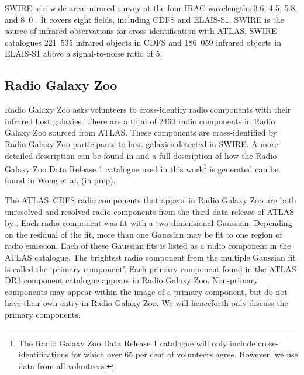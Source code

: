 \documentclass[fleqn,usenatbib,usedcolumn]{mnras}
\begin{document}
    SWIRE \citep{lonsdale03swire, surace05swire} is a wide-area infrared
    survey at the four IRAC wavelengths 3.6, 4.5, 5.8, and
    \unit{8.0}{\micro\meter} \citep{lonsdale03swire}. It covers eight fields, including CDFS and ELAIS-S1. SWIRE is the source of infrared
    observations for cross-identification with ATLAS. SWIRE catalogues 221~535
    infrared objects in CDFS and 186~059 infrared objects in ELAIS-S1 above a signal-to-noise ratio of 5.

  \subsection{Radio Galaxy Zoo}\label{sec:rgz}

    Radio Galaxy Zoo asks volunteers to cross-identify radio components with
    their infrared host galaxies. There are a total of 2460 radio
    components in Radio Galaxy Zoo sourced from ATLAS. These
    components are cross-identified by Radio Galaxy Zoo participants to host galaxies detected in SWIRE.
    A more detailed description can be found in
    \citet{banfield15} and a full description of how the Radio Galaxy Zoo Data Release 1 catalogue used in this work\footnote{The Radio Galaxy Zoo Data Release 1 catalogue will only
    include cross-identifications for which over 65 per cent of volunteers
    agree. However, we use data from all volunteers.}
    is generated can be found in Wong et al. (in prep).

     The ATLAS~CDFS radio components that appear in Radio Galaxy Zoo are both unresolved and resolved radio components from the third data release of ATLAS by \citet{franzen15}.  Each radio component was fit with a two-dimensional
    Gaussian. Depending on the residual of the fit, more than one Gaussian may
    be fit to one region of radio emission.  Each of these Gaussian fits is
    listed as a radio component in the ATLAS catalogue. The brightest radio
    component from the multiple Gaussian fit is called the `primary
    component'. Each primary component found in the ATLAS DR3 component
    catalogue appears in Radio Galaxy Zoo. Non-primary components may appear
    within the image of a primary component, but do not have their own entry
    in Radio Galaxy Zoo. We will henceforth only discuss the primary
    components.
\end{document}
